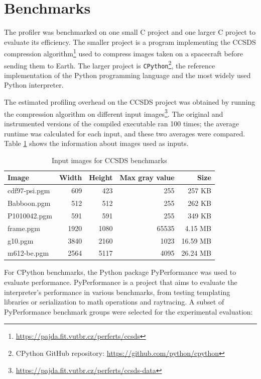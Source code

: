 \section{Benchmarks}
\label{benchmarks}

The profiler was benchmarked on one small C project and one larger C project to evaluate its efficiency. The smaller project is a program implementing the CCSDS compression algorithm\footnote{\url{https://pajda.fit.vutbr.cz/perferts/ccsds}} used to compress images taken on a spacecraft before sending them to Earth. The larger project is \texttt{CPython}\footnote{CPython GitHub repository: \url{https://github.com/python/cpython}}, the reference implementation of the Python programming language and the most widely used Python interpreter. 

The estimated profiling overhead on the CCSDS project was obtained by running the compression algorithm on different input images\footnote{\url{https://pajda.fit.vutbr.cz/perferts/ccsds-data}}. The original and instrumented versions of the compiled executable ran 100 times; the average runtime was calculated for each input, and these two averages were compared. Table \ref{tab:ccsds-img} shows the information about images used as inputs.

\begin{table}[t]
    \centering
    \begin{tabular}{lrrrr}
    \textbf{Image} & \textbf{Width} & \textbf{Height} & \textbf{Max gray value} & \textbf{Size} \\
    \hline 
    \hline
    cdf97-psi.pgm & 609 & 423 & 255 & 257 KB \\
    Babboon.pgm & 512 & 512 & 255 & 262 KB \\
    P1010042.pgm & 591 & 591 & 255 &  349 KB \\
    frame.pgm & 1920 & 1080 & 65535 & 4.15 MB \\
    g10.pgm & 3840 & 2160 & 1023 & 16.59 MB \\
    m612-be.pgm & 2564 & 5117 & 4095 & 26.24 MB \\
    \end{tabular}
    \caption{Input images for CCSDS benchmarks}
    \label{tab:ccsds-img}
\end{table}


For CPython benchmarks, the Python package PyPerformance \cite{pyperformance} was used to evaluate performance. PyPerformance is a project that aims to evaluate the interpreter's performance in various benchmarks, from testing templating libraries or serialization to math operations and raytracing. A subset of PyPerformance benchmark groups were selected for the experimental evaluation:

